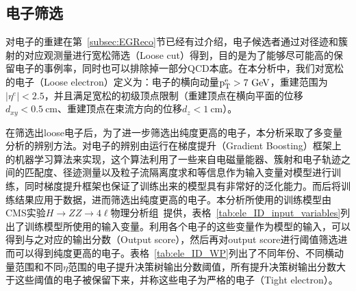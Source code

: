 \subsection{电子筛选}

对电子的重建在第~\ref{subsec:EGReco}节已经有过介绍，电子候选者通过对径迹和簇射的对应观测量进行宽松筛选（Loose cut）得到，目的是为了能够尽可能高的保留电子的事例率，同时也可以排除掉一部分QCD本底。在本分析中，我们对宽松的电子（Loose electron）定义为：电子的横向动量$\mathrm{p_{T}^{e}}>7\GeV$，重建范围为$|\eta^{e}|<2.5$，并且满足宽松的初级顶点限制（重建顶点在横向平面的位移$d_{xy}<0.5~\si{\cm}$、重建顶点在束流方向的位移$d_{z}<1~\si{\cm}$）。

在筛选出loose电子后，为了进一步筛选出纯度更高的电子，本分析采取了多变量分析的辨别方法。对电子的辨别由运行在梯度提升（Gradient Boosting）框架上的机器学习算法来实现，这个算法利用了一些来自电磁量能器、簇射和电子轨迹之间的匹配度、径迹测量以及粒子流隔离度求和等信息作为输入变量对模型进行训练，同时梯度提升框架也保证了训练出来的模型具有非常好的泛化能力。而后将训练结果应用于数据，进而筛选出纯度更高的电子。本分析所使用的训练模型由CMS实验$H\rightarrow ZZ\rightarrow 4\ell$物理分析组~\cite{cmsHZZ}提供，表格~\ref{tab:ele_ID_input_variables}列出了训练模型所使用的输入变量。利用各个电子的这些变量作为模型的输入，可以得到与之对应的输出分数（Output score），然后再对output score进行阈值筛选进而可以得到纯度更高的电子。表格~\ref{tab:ele_ID_WP}列出了不同年份、不同横动量范围和不同$\eta$范围的电子提升决策树输出分数阈值，所有提升决策树输出分数大于这些阈值的电子被保留下来，并称这些电子为严格的电子（Tight electron）。


